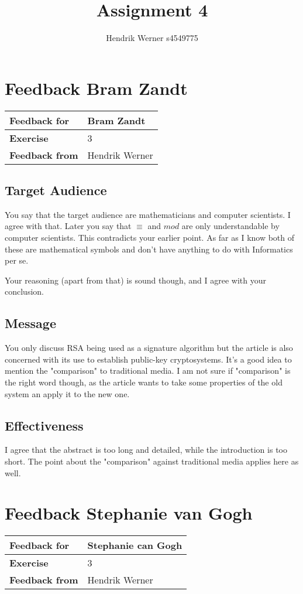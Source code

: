 \documentclass[12pt, a4paper]{article}
\title{Assignment 4}
\author{Hendrik Werner s4549775}
\begin{document}
\maketitle

\clearpage
\section{Feedback Bram Zandt}
\begin{tabular}{|l|l|}
	\hline
	\textbf{Feedback for} & Bram Zandt\\\hline
	\textbf{Exercise} & 3\\\hline
	\textbf{Feedback from} & Hendrik Werner\\\hline
\end{tabular}

\subsection{Target Audience}
You say that the target audience are mathematicians and computer scientists. I agree with that. Later you say that $\equiv$ and $mod$ are only understandable by computer scientists. This contradicts your earlier point. As far as I know both of these are mathematical symbols and don't have anything to do with Informatics per se.

Your reasoning (apart from that) is sound though, and I agree with your conclusion.

\subsection{Message}
You only discuss RSA being used as a signature algorithm but the article is also concerned with its use to establish public-key cryptosystems. It's a good idea to mention the "comparison" to traditional media. I am not sure if "comparison" is the right word though, as the article wants to take some properties of the old system an apply it to the new one.

\subsection{Effectiveness}
I agree that the abstract is too long and detailed, while the introduction is too short. The point about the "comparison" against traditional media applies here as well.

\clearpage
\section{Feedback Stephanie van Gogh}
\begin{tabular}{|l|l|}
	\hline
	\textbf{Feedback for} & Stephanie can Gogh\\\hline
	\textbf{Exercise} & 3\\\hline
	\textbf{Feedback from} & Hendrik Werner\\\hline
\end{tabular}
\end{document}
